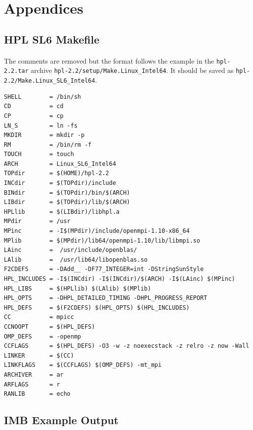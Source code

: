 \documentclass{article}
\newenvironment{code}{\captionsetup{type=listing}}{}
\begin{document}
\appendix
    \section*{Appendices}
    \renewcommand{\thesubsection}{\Alph{subsection}}

    \subsection{HPL SL6 Makefile}
    \label{appendix:makefile}

    \paragraph{}
    The comments are removed but the format follows the example in the \verb|hpl-2.2.tar| archive \verb|hpl-2.2/setup/Make.Linux_Intel64|. It should be saved as \verb|hpl-2.2/Make.Linux_SL6_Intel64|.
        \begin{code}
        \label{code:builds-cloud-make-linux_sl6_intel64}
        \begin{verbatim}
SHELL        = /bin/sh
CD           = cd
CP           = cp
LN_S         = ln -fs
MKDIR        = mkdir -p
RM           = /bin/rm -f
TOUCH        = touch
ARCH         = Linux_SL6_Intel64
TOPdir       = $(HOME)/hpl-2.2
INCdir       = $(TOPdir)/include
BINdir       = $(TOPdir)/bin/$(ARCH)
LIBdir       = $(TOPdir)/lib/$(ARCH)
HPLlib       = $(LIBdir)/libhpl.a
MPdir        = /usr
MPinc        = -I$(MPdir)/include/openmpi-1.10-x86_64
MPlib        = $(MPdir)/lib64/openmpi-1.10/lib/libmpi.so
LAinc        =  /usr/include/openblas/
LAlib        =  /usr/lib64/libopenblas.so
F2CDEFS      = -DAdd__ -DF77_INTEGER=int -DStringSunStyle
HPL_INCLUDES = -I$(INCdir) -I$(INCdir)/$(ARCH) -I$(LAinc) $(MPinc)
HPL_LIBS     = $(HPLlib) $(LAlib) $(MPlib)
HPL_OPTS     = -DHPL_DETAILED_TIMING -DHPL_PROGRESS_REPORT
HPL_DEFS     = $(F2CDEFS) $(HPL_OPTS) $(HPL_INCLUDES)
CC           = mpicc
CCNOOPT      = $(HPL_DEFS)
OMP_DEFS     = -openmp
CCFLAGS      = $(HPL_DEFS) -O3 -w -z noexecstack -z relro -z now -Wall
LINKER       = $(CC)
LINKFLAGS    = $(CCFLAGS) $(OMP_DEFS) -mt_mpi
ARCHIVER     = ar
ARFLAGS      = r
RANLIB       = echo

        \end{verbatim}
        \end{code}

    \subsection{IMB Example Output}
        \label{appendix:imb-example-output}
\end{document}
